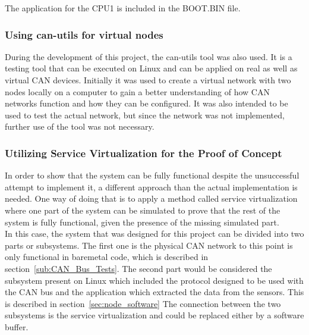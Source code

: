 The application for the CPU1 is included in the BOOT.BIN file.

\subsubsection{Using can-utils for virtual nodes}

During the development of this project, the can-utils tool was also used.
It is a testing tool that can be executed on Linux and can be applied on real as well as virtual CAN devices.
Initially it was used to create a virtual network with two nodes locally on a computer to gain a better understanding of how CAN networks function and how they can be configured.
It was also intended to be used to test the actual network, but since the network was not implemented, further use of the tool was not necessary.

\subsubsection{Utilizing Service Virtualization for the Proof of Concept}
\label{sub:Utilizing_Svr_Virtualization}

In order to show that the system can be fully functional despite the unsuccessful attempt to implement it, a different approach than the actual implementation is needed.
One way of doing that is to apply a method called service virtualization where one part of the system can be simulated to prove that the rest of the system is fully functional, given the presence of the missing simulated part.
\\
In this case, the system that was designed for this project can be divided into two parts or subsystems.
The first one is the physical CAN network to this point is only functional in bare\-metal code, which is described in section~\ref{sub:CAN_Bus_Tests}.
The second part would be considered the subsystem present on Linux which included the protocol designed to be used with the CAN bus and the application which extracted the data from the sensors.
This is described in section~\ref{sec:node_software}
The connection between the two subsystems is the service virtualization and could be replaced either by a software buffer.



%
%
%
